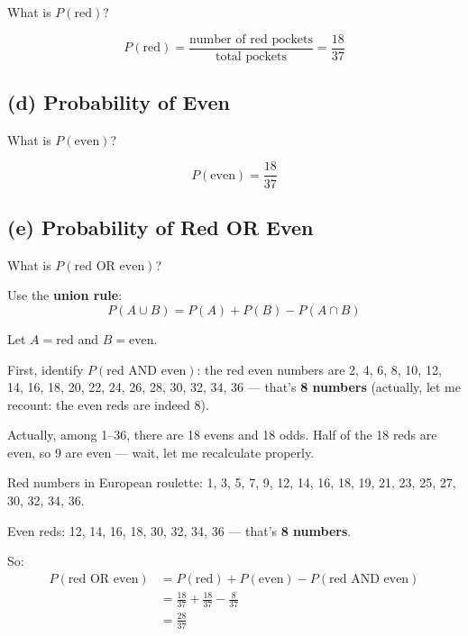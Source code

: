\documentclass[11pt,a4paper]{article}
\begin{document}
\begin{question}
What is $P(\text{red})$?
\end{question}

\begin{answer}
\[
P(\text{red}) = \frac{\text{number of red pockets}}{\text{total pockets}} = \frac{18}{37}
\]
\end{answer}

\subsection*{(d) Probability of Even}

\begin{question}
What is $P(\text{even})$?
\end{question}

\begin{answer}
\[
P(\text{even}) = \frac{18}{37}
\]
\end{answer}

\subsection*{(e) Probability of Red OR Even}

\begin{question}
What is $P(\text{red OR even})$?
\end{question}

\begin{answer}
Use the \textbf{union rule}:
\[
P(A \cup B) = P(A) + P(B) - P(A \cap B)
\]

Let $A = \text{red}$ and $B = \text{even}$.

First, identify $P(\text{red AND even})$: the red even numbers are 2, 4, 6, 8, 10, 12, 14, 16, 18, 20, 22, 24, 26, 28, 30, 32, 34, 36 — that's \textbf{8 numbers} (actually, let me recount: the even reds are indeed 8).

Actually, among 1--36, there are 18 evens and 18 odds. Half of the 18 reds are even, so 9 are even — wait, let me recalculate properly.

Red numbers in European roulette: 1, 3, 5, 7, 9, 12, 14, 16, 18, 19, 21, 23, 25, 27, 30, 32, 34, 36.

Even reds: 12, 14, 16, 18, 30, 32, 34, 36 — that's \textbf{8 numbers}.

So:
\begin{align}
P(\text{red OR even}) &= P(\text{red}) + P(\text{even}) - P(\text{red AND even})\\
&= \frac{18}{37} + \frac{18}{37} - \frac{8}{37}\\
&= \frac{28}{37}
\end{align}
\end{answer}
\end{document}
